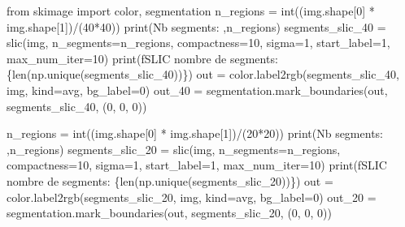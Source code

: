 \documentclass[
  11pt,
  letterpaper,
  open=any,
  twoside=false,
  french]{scrbook}
\newenvironment{Shaded}{\begin{snugshade}}{\end{snugshade}}
\newcommand{\BuiltInTok}[1]{\textcolor[rgb]{0.00,0.23,0.31}{#1}}
\newcommand{\DecValTok}[1]{\textcolor[rgb]{0.68,0.00,0.00}{#1}}
\newcommand{\ImportTok}[1]{\textcolor[rgb]{0.00,0.46,0.62}{#1}}
\newcommand{\NormalTok}[1]{\textcolor[rgb]{0.00,0.23,0.31}{#1}}
\newcommand{\OperatorTok}[1]{\textcolor[rgb]{0.37,0.37,0.37}{#1}}
\newcommand{\SpecialCharTok}[1]{\textcolor[rgb]{0.37,0.37,0.37}{#1}}
\newcommand{\SpecialStringTok}[1]{\textcolor[rgb]{0.13,0.47,0.30}{#1}}
\newcommand{\StringTok}[1]{\textcolor[rgb]{0.13,0.47,0.30}{#1}}
\begin{document}
\begin{Shaded}
\begin{Highlighting}[]
\ImportTok{from}\NormalTok{ skimage }\ImportTok{import}\NormalTok{ color, segmentation}
\NormalTok{n\_regions }\OperatorTok{=} \BuiltInTok{int}\NormalTok{((img.shape[}\DecValTok{0}\NormalTok{] }\OperatorTok{*}\NormalTok{ img.shape[}\DecValTok{1}\NormalTok{])}\OperatorTok{/}\NormalTok{(}\DecValTok{40}\OperatorTok{*}\DecValTok{40}\NormalTok{))}
\BuiltInTok{print}\NormalTok{(}\StringTok{\textquotesingle{}Nb segments: \textquotesingle{}}\NormalTok{,n\_regions)}
\NormalTok{segments\_slic\_40 }\OperatorTok{=}\NormalTok{ slic(img, n\_segments}\OperatorTok{=}\NormalTok{n\_regions, compactness}\OperatorTok{=}\DecValTok{10}\NormalTok{, sigma}\OperatorTok{=}\DecValTok{1}\NormalTok{, start\_label}\OperatorTok{=}\DecValTok{1}\NormalTok{, max\_num\_iter}\OperatorTok{=}\DecValTok{10}\NormalTok{)}
\BuiltInTok{print}\NormalTok{(}\SpecialStringTok{f\textquotesingle{}SLIC nombre de segments: }\SpecialCharTok{\{}\BuiltInTok{len}\NormalTok{(np.unique(segments\_slic\_40))}\SpecialCharTok{\}}\SpecialStringTok{\textquotesingle{}}\NormalTok{)}
\NormalTok{out }\OperatorTok{=}\NormalTok{ color.label2rgb(segments\_slic\_40, img, kind}\OperatorTok{=}\StringTok{\textquotesingle{}avg\textquotesingle{}}\NormalTok{, bg\_label}\OperatorTok{=}\DecValTok{0}\NormalTok{)}
\NormalTok{out\_40 }\OperatorTok{=}\NormalTok{ segmentation.mark\_boundaries(out, segments\_slic\_40, (}\DecValTok{0}\NormalTok{, }\DecValTok{0}\NormalTok{, }\DecValTok{0}\NormalTok{))}

\NormalTok{n\_regions }\OperatorTok{=} \BuiltInTok{int}\NormalTok{((img.shape[}\DecValTok{0}\NormalTok{] }\OperatorTok{*}\NormalTok{ img.shape[}\DecValTok{1}\NormalTok{])}\OperatorTok{/}\NormalTok{(}\DecValTok{20}\OperatorTok{*}\DecValTok{20}\NormalTok{))}
\BuiltInTok{print}\NormalTok{(}\StringTok{\textquotesingle{}Nb segments: \textquotesingle{}}\NormalTok{,n\_regions)}
\NormalTok{segments\_slic\_20 }\OperatorTok{=}\NormalTok{ slic(img, n\_segments}\OperatorTok{=}\NormalTok{n\_regions, compactness}\OperatorTok{=}\DecValTok{10}\NormalTok{, sigma}\OperatorTok{=}\DecValTok{1}\NormalTok{, start\_label}\OperatorTok{=}\DecValTok{1}\NormalTok{, max\_num\_iter}\OperatorTok{=}\DecValTok{10}\NormalTok{)}
\BuiltInTok{print}\NormalTok{(}\SpecialStringTok{f\textquotesingle{}SLIC nombre de segments: }\SpecialCharTok{\{}\BuiltInTok{len}\NormalTok{(np.unique(segments\_slic\_20))}\SpecialCharTok{\}}\SpecialStringTok{\textquotesingle{}}\NormalTok{)}
\NormalTok{out }\OperatorTok{=}\NormalTok{ color.label2rgb(segments\_slic\_20, img, kind}\OperatorTok{=}\StringTok{\textquotesingle{}avg\textquotesingle{}}\NormalTok{, bg\_label}\OperatorTok{=}\DecValTok{0}\NormalTok{)}
\NormalTok{out\_20 }\OperatorTok{=}\NormalTok{ segmentation.mark\_boundaries(out, segments\_slic\_20, (}\DecValTok{0}\NormalTok{, }\DecValTok{0}\NormalTok{, }\DecValTok{0}\NormalTok{))}


\end{Highlighting}
\end{Shaded}
\end{document}
